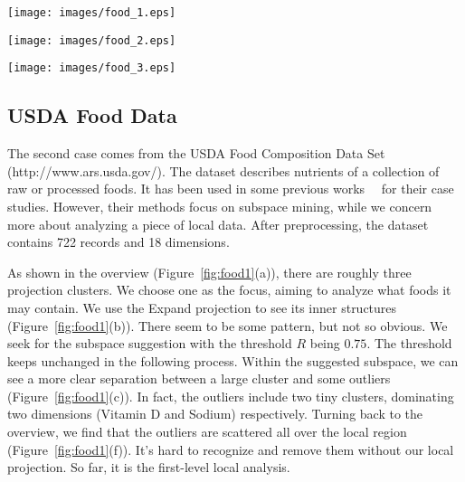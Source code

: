 \begin{figure*}[htbp]
\centering
  \texttt{[image: images/food\_1.eps]}%
  \caption{USDA Food Data: First-level local analysis}
\label{fig:food1}
  \end{figure*}

\begin{figure*}[htbp]
\centering
  \texttt{[image: images/food\_2.eps]}%
  \caption{USDA Food Data: Second-level local analysis}
\label{fig:food2}
  \end{figure*}

\begin{figure*}[htbp]
\centering
  \texttt{[image: images/food\_3.eps]}%
  \caption{USDA Food Data: Third-level local analysis}
\label{fig:food3}
  \end{figure*}

\subsection{USDA Food Data}
The second case comes from the USDA Food Composition Data Set (http://www.ars.usda.gov/).  The dataset describes nutrients of a collection of raw or processed foods. It has been used in some previous works~\cite{DBLP:conf/ieeevast/TatuMFBSSK12}~\cite{DBLP:journals/tvcg/YuanRWG13} for their case studies. However, their methods focus on subspace mining, while we concern more about analyzing a piece of local data. After preprocessing, the dataset contains 722 records and 18 dimensions.

As shown in the overview (Figure~\ref{fig:food1}(a)), there are roughly three projection clusters. We choose one as the focus, aiming to analyze what foods it may contain. We use the Expand projection to see its inner structures (Figure~\ref{fig:food1}(b)). There seem to be some pattern, but not so obvious. We seek for the subspace suggestion with the threshold $R$ being $0.75$. The threshold keeps unchanged in the following process. Within the suggested subspace, we can see a more clear separation between a large  cluster and some outliers (Figure~\ref{fig:food1}(c)). In fact, the outliers include two tiny clusters, dominating two dimensions (Vitamin D and Sodium) respectively. Turning back to the overview, we find that the outliers are scattered all over the local region (Figure~\ref{fig:food1}(f)). It's hard to recognize and remove them without our local projection. So far, it is the first-level local analysis.

